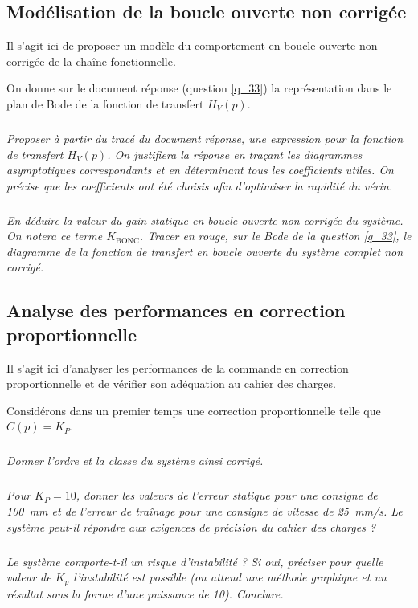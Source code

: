 \documentclass[10pt,fleqn]{article} %
\begin{document}
\subsection{Modélisation de la boucle ouverte non corrigée}

\begin{obj}
Il s'agit ici de proposer un modèle du comportement en boucle ouverte non corrigée de la chaîne fonctionnelle.
\end{obj}

On donne  sur le document réponse (question \ref{q_33}) la représentation dans le plan de Bode de la fonction de transfert $H_V(p)$.
	
\subparagraph{\label{q_33}}\textit{Proposer à partir du tracé du document réponse, une expression pour la fonction de transfert $H_V(p)$. On justifiera la réponse en traçant les diagrammes asymptotiques correspondants et en déterminant tous les coefficients utiles. On précise que les coefficients ont été choisis afin d'optimiser la rapidité du vérin.  }




\subparagraph{}\textit{En déduire la valeur du gain statique en boucle ouverte non corrigée du système. On notera ce terme $K_{\text{BONC}}$. Tracer en rouge, sur le Bode de la question \ref{q_33}, le diagramme de la fonction de transfert en boucle ouverte du système complet non corrigé.  }

\subsection{Analyse des performances en correction proportionnelle}

\begin{obj}
Il s'agit ici d'analyser les performances de la commande en correction proportionnelle et de vérifier son adéquation au cahier des charges.
\end{obj}

Considérons dans un premier temps une correction proportionnelle telle que  $C(p)=K_P$.

\subparagraph{}\textit{Donner l'ordre et la classe du système ainsi corrigé.  }

\subparagraph{}\textit{Pour $K_P = 10$, donner les valeurs de l'erreur statique pour une consigne de \SI{100}{mm} et de l'erreur de traînage pour une consigne de vitesse de \SI{25}{mm/s}.  Le système peut-il répondre aux exigences de précision du cahier des charges ?}

\subparagraph{}\textit{Le système comporte-t-il un risque d'instabilité ? Si oui, préciser pour quelle valeur de $K_p$ l'instabilité est possible (on attend une méthode graphique et un résultat sous la forme d'une puissance de 10). Conclure.}
\end{document}
